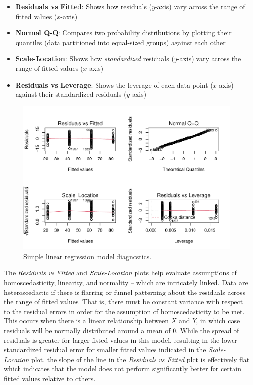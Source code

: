 \documentclass[
]{book}
\providecommand{\tightlist}{%
  \setlength{\itemsep}{0pt}\setlength{\parskip}{0pt}}
\begin{document}
\begin{itemize}
\tightlist
\item
  \textbf{Residuals vs Fitted}: Shows how residuals (\(y\)-axis) vary across the range of fitted values (\(x\)-axis)
\item
  \textbf{Normal Q-Q}: Compares two probability distributions by plotting their quantiles (data partitioned into equal-sized groups) against each other
\item
  \textbf{Scale-Location}: Shows how \emph{standardized} residuals (\(y\)-axis) vary across the range of fitted values (\(x\)-axis)
\item
  \textbf{Residuals vs Leverage}: Shows the leverage of each data point (\(x\)-axis) against their standardized residuals (\(y\)-axis)
\end{itemize}

\begin{figure}

{\centering \includegraphics[width=1\linewidth]{The_Fundamentals_of_People_Analytics_files/figure-latex/slm-diagnostics-1} 

}

\caption{Simple linear regression model diagnostics.}\label{fig:slm-diagnostics}
\end{figure}

The \emph{Residuals vs Fitted} and \emph{Scale-Location} plots help evaluate assumptions of homoscedasticity, linearity, and normality -- which are intricately linked. Data are heteroscedastic if there is flarring or funnel patterning about the residuals across the range of fitted values. That is, there must be constant variance with respect to the residual errors in order for the assumption of homoscedasticity to be met. This occurs when there is a linear relationship between \(X\) and \(Y\), in which case residuals will be normally distributed around a mean of 0. While the spread of residuals is greater for larger fitted values in this model, resulting in the lower standardized residual error for smaller fitted values indicated in the \emph{Scale-Location} plot, the slope of the line in the \emph{Residuals vs Fitted} plot is effectively flat which indicates that the model does not perform significantly better for certain fitted values relative to others.
\end{document}
